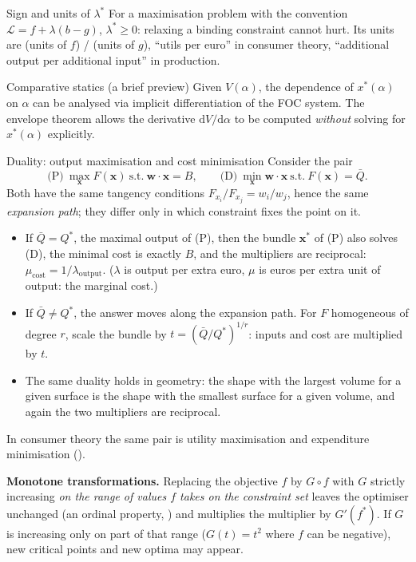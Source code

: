 \begin{rulebox}{Sign and units of $\lambda^*$}
For a maximisation problem with the convention
$\mathcal{L} = f + \lambda(b - g)$, $\lambda^* \geq 0$: relaxing a binding
constraint cannot hurt. Its units are (units of $f$) / (units of $g$),
``utils per euro'' in consumer theory, ``additional output per additional
input'' in production.
\end{rulebox}

\begin{rulebox}{Comparative statics (a brief preview)}
Given $V(\alpha)$, the dependence of $x^*(\alpha)$ on $\alpha$ can be
analysed via implicit differentiation of the FOC system. The envelope
theorem allows the derivative $\mathrm{d}V/\mathrm{d}\alpha$ to be computed
\emph{without} solving for $x^*(\alpha)$ explicitly.
\end{rulebox}

\begin{rulebox}{Duality: output maximisation and cost minimisation}
Consider the pair
\[
  \text{(P)}\ \max_{\mathbf{x}}F(\mathbf{x})\ \text{s.t.}\ \mathbf{w}\cdot\mathbf{x}=B,
  \qquad
  \text{(D)}\ \min_{\mathbf{x}}\mathbf{w}\cdot\mathbf{x}\ \text{s.t.}\ F(\mathbf{x})=\bar Q .
\]
Both have the same tangency conditions
$F_{x_i}/F_{x_j}=w_i/w_j$, hence the same \emph{expansion path}; they differ
only in which constraint fixes the point on it.
\begin{itemize}[leftmargin=1.6em,itemsep=0.3ex]
  \item If $\bar Q=Q^*$, the maximal output of (P), then the bundle
        $\mathbf{x}^*$ of (P) also solves (D), the minimal cost is exactly
        $B$, and the multipliers are reciprocal:
        $\mu_{\text{cost}}=1/\lambda_{\text{output}}$. ($\lambda$ is output
        per extra euro, $\mu$ is euros per extra unit of output: the
        marginal cost.)
  \item If $\bar Q\neq Q^*$, the answer moves along the expansion path. For
        $F$ homogeneous of degree $r$, scale the bundle by
        $t=(\bar Q/Q^*)^{1/r}$: inputs and cost are multiplied by $t$.
  \item The same duality holds in geometry: the shape with the largest
        volume for a given surface is the shape with the smallest surface
        for a given volume, and again the two multipliers are reciprocal.
\end{itemize}
In consumer theory the same pair is utility maximisation and expenditure
minimisation ().

\textbf{Monotone transformations.} Replacing the objective $f$ by $G\circ f$
with $G$ strictly increasing \emph{on the range of values $f$ takes on the
constraint set} leaves the optimiser unchanged (an ordinal property,
) and multiplies the multiplier by $G'(f^*)$. If $G$ is increasing
only on part of that range ($G(t)=t^{2}$ where $f$ can be negative), new
critical points and new optima may appear.
\end{rulebox}

